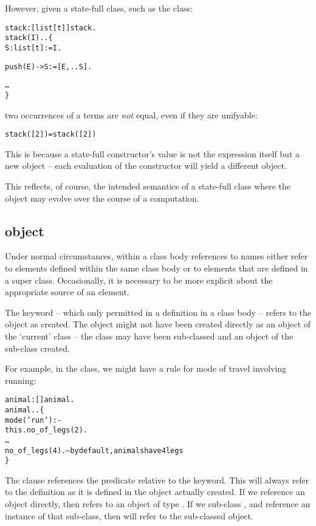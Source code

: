 However, given a state-full class, such as the  class:
\begin{alltt}
stack:[list[t]]\sconarrow{}stack.
stack(I)..\{
  S:list[t] := I.

  push(E) -> S:=[E,..S].

  \ldots
\}
\end{alltt}
two occurrences of a  terms are \emph{not} equal, even if they are unifyable:
\begin{alltt}
\nasf{} stack([2])=stack([2])
\end{alltt}
This is because a state-full constructor's value is not the expression itself but a new object -- each evaluation of the constructor will yield a different object.

This reflects, of course, the intended semantics of a state-full class where the object may evolve over the course of a computation.

\subsection{ object}
\label{objects:this}

Under normal circumstances, within a class body references to names either refer to elements defined within the same class body or to elements that are defined in a super class. Occasionally, it is necessary to be more explicit about the appropriate source of an element.

The  keyword -- which only permitted in a definition in a class body -- refers to the object as created. The object might not have been created directly as an object of the `current' class -- the class may have been sub-classed and an object of the sub-class created.

For example, in the  class, we might have a rule for mode of travel involving running:
\begin{alltt}
animal:[]\conarrow{}animal.
animal..\{
  mode('run') :-
    this.no\_of\_legs(2).
  \ldots
  no\_of\_legs(4).       -- by default, animals have 4 legs
\}
\end{alltt}
The  clause references the  predicate relative to the  keyword. This will always refer to the  definition as it is defined in the object actually created. If we reference an  object directly, then  refers to an object of type . If we sub-class , and reference an instance of that sub-class, then  will refer to the sub-classed object.

